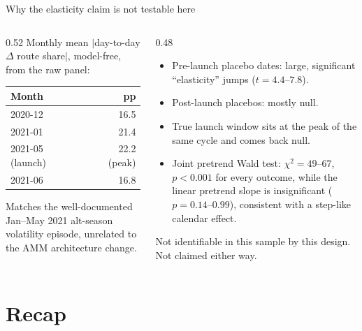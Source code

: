 \documentclass[aspectratio=169]{beamer}
\begin{document}
\begin{frame}{Why the elasticity claim is not testable here}
  \begin{columns}[T]
    \begin{column}{0.52\textwidth}
      \small
      Monthly mean $|$day-to-day $\Delta$ route share$|$, model-free, from the raw panel:
      \begin{center}
      \begin{tabular}{@{}l r@{}}
        \toprule
        Month & pp \\
        \midrule
        2020-12 & 16.5 \\
        2021-01 & 21.4 \\
        2021-05 (launch) & 22.2 (peak) \\
        2021-06 & 16.8 \\
        \bottomrule
      \end{tabular}
      \end{center}
      {\footnotesize Matches the well-documented Jan--May 2021 alt-season volatility episode, unrelated to the AMM architecture change.}
    \end{column}
    \begin{column}{0.48\textwidth}
      \small
      \begin{itemize}
        \item Pre-launch placebo dates: large, significant ``elasticity'' jumps ($t=4.4$--$7.8$).
        \item Post-launch placebos: mostly null.
        \item True launch window sits at the peak of the same cycle and comes back null.
        \item Joint pretrend Wald test: $\chi^2=49$--$67$, $p<0.001$ for every outcome, while the linear pretrend slope is insignificant ($p=0.14$--$0.99$), consistent with a step-like calendar effect.
      \end{itemize}
      \vspace{0.4em}
      Not identifiable in this sample by this design. Not claimed either way.
    \end{column}
  \end{columns}
\end{frame}

\section{Recap}
\end{document}
